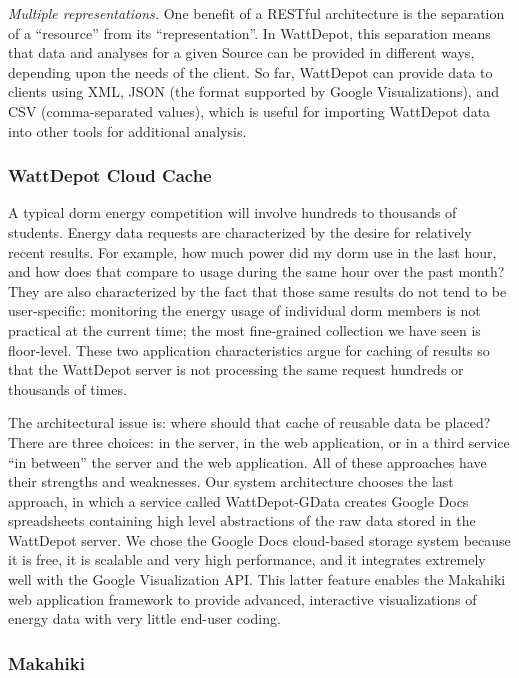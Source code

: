 {\em Multiple representations.} One benefit of a RESTful architecture is
the separation of a ``resource'' from its ``representation''.  In
WattDepot, this separation means that data and analyses for a given Source can
be provided in different ways, depending upon the needs of the client.  So
far, WattDepot can provide data to clients using XML, JSON (the format
supported by Google Visualizations), and CSV (comma-separated values),
which is useful for importing WattDepot data into other tools for
additional analysis.

\subsubsection{WattDepot Cloud Cache}

A typical dorm energy competition will involve hundreds to thousands of
students.  Energy data requests are characterized by the desire for
relatively recent results. For example, how much power did my dorm use in
the last hour, and how does that compare to usage during the same hour over
the past month? They are also characterized by the fact that those same
results do not tend to be user-specific: monitoring the energy usage of
individual dorm members is not practical at the current time; the most
fine-grained collection we have seen is floor-level. These two application
characteristics argue for caching of results so that the WattDepot server
is not processing the same request hundreds or thousands of times.

The architectural issue is: where should that cache of reusable data be
placed?  There are three choices: in the server, in the web application, or
in a third service ``in between'' the server and the web application.
All of these approaches have their strengths and weaknesses.  Our system
architecture chooses the last approach, in which a service called
WattDepot-GData creates Google Docs spreadsheets containing high level
abstractions of the raw data stored in the WattDepot server.  We chose the
Google Docs cloud-based storage system because it is free, it is scalable
and very high performance, and it integrates extremely well with the Google
Visualization API.  This latter feature enables the Makahiki web
application framework to provide advanced, interactive visualizations of
energy data with very little end-user coding.

\subsubsection{Makahiki}

